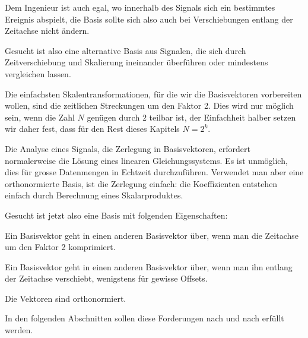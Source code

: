 Dem Ingenieur ist auch egal, wo innerhalb des Signals sich
ein bestimmtes Ereignis abspielt, die Basis sollte sich also
auch bei Verschiebungen entlang der Zeitachse nicht ändern.

Gesucht ist also eine alternative Basis aus Signalen, die
sich durch Zeitverschiebung und Skalierung ineinander überführen
oder mindestens vergleichen lassen.

Die einfachsten Skalentransformationen, für die wir die Basisvektoren
vorbereiten wollen, sind die zeitlichen Streckungen um den Faktor 2.
Dies wird nur möglich sein, wenn die Zahl $N$ genügen durch $2$
teilbar ist, der Einfachheit halber setzen wir daher fest, dass
für den Rest dieses Kapitels $N=2^k$.

Die Analyse eines Signals, die Zerlegung in Basisvektoren, erfordert
normalerweise die Lösung eines linearen Gleichungssystems.
Es ist unmöglich, dies für grosse Datenmengen in Echtzeit
durchzuführen. Verwendet man aber eine orthonormierte Basis,
ist die Zerlegung einfach: die Koeffizienten entstehen einfach
durch Berechnung eines Skalarproduktes.

Gesucht ist jetzt also eine Basis mit folgenden Eigenschaften:
\begin{compactenum}
\item Ein Basisvektor geht in einen anderen Basisvektor über, wenn
man die Zeitachse um den Faktor 2 komprimiert.
\item Ein Basisvektor geht in einen anderen Basisvektor über, wenn
man ihn entlang der Zeitachse verschiebt, wenigstens für
gewisse Offsets.
\item Die Vektoren sind orthonormiert.
\end{compactenum}
In den folgenden Abschnitten sollen diese Forderungen nach und
nach erfüllt werden.

